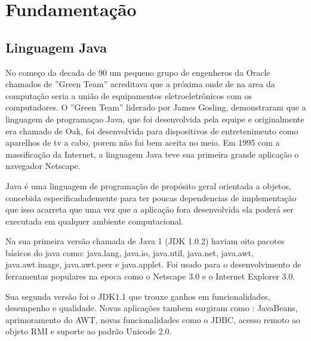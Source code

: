 \chapter{Fundamentação}
\section{Linguagem Java}
No começo da decada de 90 um pequeno grupo de engenheros da Oracle chamados de ''Green Team'' acreditava que a próxima onde de na area da computação seria a união de equipamentos eletroeletrônicos com os computadores. O ''Green Team'' liderado por James Gosling, demonstraram que a linguagem de programaçao Java, que foi desenvolvida pela equipe e originalmente era chamado de Oak, foi desenvolvida para dispositivos de entretenimento como aparelhos de tv a cabo, porem não foi bem aceita no meio. Em 1995 com a massificação da Internet, a linguagem Java teve sua primeira grande aplicação o navegador Netscape.

Java é uma linguagem de programação de propósito geral orientada a objetos, concebida especificadademente para ter poucas dependencias de implementação que isso acarreta que uma vez que a aplicação fora desenvolvida ela poderá ser executada em qualquer ambiente computacional.

Na sua primeira versão chamada de Java 1 (\acs{JDK} 1.0.2) haviam oito pacotes básicos do java como: java.lang, java.io, java.util, java.net, java.awt, java.awt.image, java.awt.peer e java.applet. Foi usado para o desenvolvimento de ferramentas populares na epoca como o Netscape 3.0 e o Internet Explorer 3.0.

Sua segunda versão foi o \acs{JDK}1.1 \cite{JDK1.1} que trouxe ganhos em funcionalidades, desempenho e qualidade. Novas aplicações tambem surgiram como : JavaBeans, aprimoramento do \acs{AWT}, novas funcionalidades como o \acs{JDBC}, acesso remoto ao objeto \acs{RMI} e suporte ao padrão Unicode 2.0.

